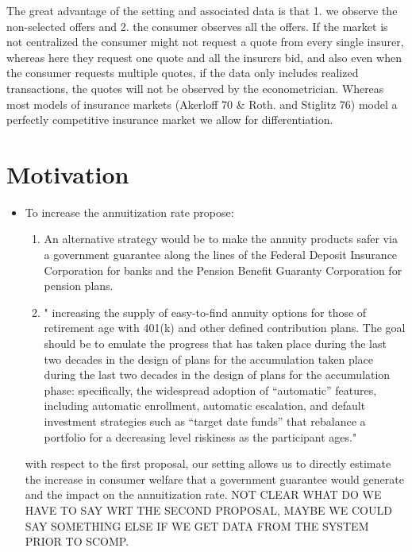 \documentclass[12pt]{article}
\theoremstyle{plain}
\theoremstyle{plain}
\begin{document}
The great advantage of the setting and associated data is that 1. we observe the non-selected offers and 2. the consumer observes all the offers. If the market is not centralized the consumer might not request a quote from every single insurer, whereas here they request one quote and all the insurers bid, and also even when the consumer requests multiple quotes, if the data only includes realized transactions, the quotes will not be observed by the econometrician. Whereas most models of insurance markets (Akerloff 70 \& Roth. and Stiglitz 76) model a perfectly competitive insurance market we allow for differentiation. 


\section{Motivation}

\begin{itemize}
    \item To increase the annuitization rate \textcite{benartzi_annuitization_2011} propose: 
    \begin{enumerate}
        \item  An alternative strategy would be to make the annuity products safer via a government guarantee along the lines of the Federal Deposit Insurance Corporation  for banks and the Pension Benefit Guaranty Corporation for pension plans.   
        \item " increasing the supply of easy-to-find annuity options for those of retirement age with 401(k) and other defined contribution plans.  The goal should be to emulate the progress that has taken place during the last two decades in the design of plans for the accumulation taken place during the last two decades in the design of plans for the accumulation phase: specifically, the widespread adoption of “automatic” features, including automatic enrollment, automatic escalation, and default investment strategies such as “target date funds” that rebalance a portfolio for a decreasing level riskiness as the participant ages."
        
    \end{enumerate}
    with respect to the first proposal, our setting allows us to directly estimate the increase in consumer welfare that a government guarantee would generate and the impact on the annuitization rate. NOT CLEAR WHAT DO WE HAVE TO SAY WRT THE SECOND PROPOSAL, MAYBE WE COULD SAY SOMETHING ELSE IF WE GET DATA FROM THE SYSTEM PRIOR TO SCOMP. 
    
\end{itemize}
\end{document}
